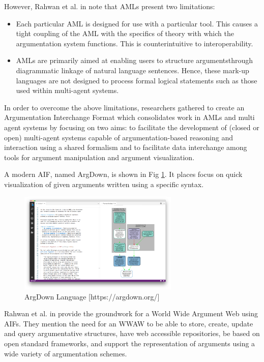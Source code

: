 \documentclass[sigconf]{acmart}
\begin{document}
However, Rahwan et al. in \cite{rahwan2009argumentation} note that AMLs present two limitations:

\begin{itemize}
  \item Each particular AML is designed for use with a particular tool. This causes a tight coupling of the AML with the specifics of theory with which the argumentation system functions. This is counterintuitive to interoperability.
  \item AMLs are primarily aimed at enabling users to structure argumentsthrough diagrammatic linkage of natural language sentences. Hence, these mark-up languages are not designed to process formal logical statements such as those used within multi-agent systems.
\end{itemize}

In order to overcome the above limitations, researchers gathered to create an Argumentation Interchange Format which consolidates work in AMLs and multi agent systems  by focusing on two aims: to facilitate the development of (closed or open) multi-agent systems capable of argumentation-based reasoning and interaction using a shared formalism and to facilitate data interchange among tools for argument manipulation and argument visualization.

A modern AIF, named ArgDown, is shown in Fig \ref{argdown}. It places focus on quick visualization of given arguments written using a specific syntax.
\begin{figure}
  \centering
  \includegraphics[width=3in]{images/argdown.png}
  \caption{ArgDown Language [https://argdown.org/]}
  \label{argdown}
\end{figure}

Rahwan et al. in \cite{rahwan2007laying} provide the groundwork for a World Wide Argument Web using AIFs. They mention the need for an WWAW to be able to store, create, update and query argumentative structures, have web accessible repositories, be based on open standard frameworks, and support the representation of arguments using a wide variety of argumentation schemes. 
\end{document}
